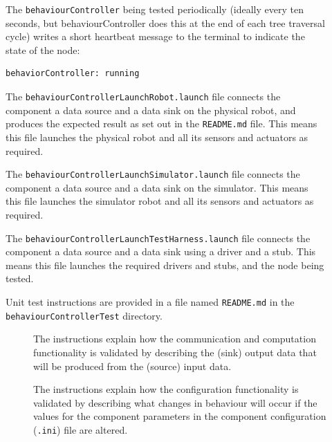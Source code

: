 \documentclass{CSSRforAfrica}
\newcommand{\checkboxChecked}{\fbox{\ding{51}}} %
\newcommand{\checkboxDashed}{\fbox{--}}         %
\begin{document}
\begin{description}
\item[\checkboxChecked]  The {\small \verb+behaviourController+} being tested periodically (ideally every ten seconds, but behaviourController does this at the end of each tree traversal cycle) writes a short heartbeat message to
 the terminal to indicate the state of the node:
\begin{verbatim}
behaviorController: running
\end{verbatim}

\item[\checkboxDashed] The {\small \verb+behaviourControllerLaunchRobot.launch+} file  connects the component a data source and a data sink on the physical robot, and produces the expected result as set out in the  {\small \verb+README.md+}  file.    This means this file launches the physical robot and all its sensors and actuators as required.

\item[\checkboxDashed] The {\small \verb+behaviourControllerLaunchSimulator.launch+} file  connects the component a data source and a data sink on the simulator.   This means this file launches the simulator robot and all its sensors and actuators as required.

\item[\checkboxDashed] The {\small \verb+behaviourControllerLaunchTestHarness.launch+} file  connects the component a data source and a data sink using a driver and a stub.   This means this file launches the required drivers and stubs, and the node being tested.

\item[\checkboxChecked] Unit test instructions are provided in a file named {\small \verb+README.md+} in the  {\small \verb+behaviourControllerTest+} directory. 


\begin{description}

\item[\checkboxChecked] The instructions explain how the communication and computation functionality is validated by describing the (sink) output data that will be produced from the (source) input data.  

\item[\checkboxChecked] The instructions explain how the configuration functionality is validated by describing what changes in behaviour will occur if the values for the component parameters in the component configuration ({\small \verb+.ini+}) file are altered.

\end{description}

\end{description} 
  
\end{document}
